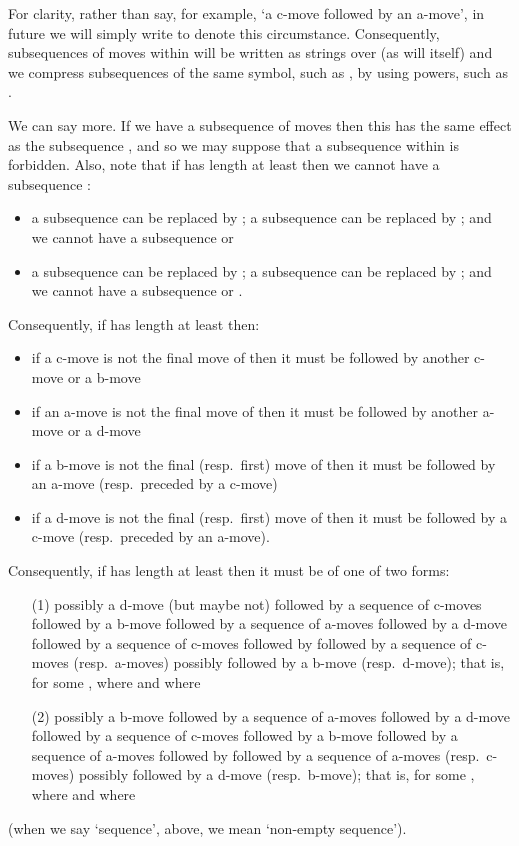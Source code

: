 \documentclass{article}
\begin{document}
For clarity, rather than say, for example, `a c-move followed by an a-move', in future we will simply write  to denote this circumstance. Consequently, subsequences of moves within  will be written as strings over  (as will  itself) and we compress subsequences of the same symbol, such as , by using powers, such as .

We can say more. If we have a subsequence of moves  then this has the same effect as the subsequence , and so we may suppose that a subsequence  within  is forbidden. Also, note that if  has length at least  then we cannot have a subsequence : 
\begin{itemize}
\item a subsequence  can be replaced by ; a subsequence  can be replaced by ; and we cannot have a subsequence  or 
\item a subsequence  can be replaced by ; a subsequence  can be replaced by ; and we cannot have a subsequence  or .
\end{itemize}
Consequently, if  has length at least  then:
\begin{itemize}
\item if a c-move is not the final move of  then it must be followed by another c-move or a b-move
\item if an a-move is not the final move of  then it must be followed by another a-move or a d-move
\item if a b-move is not the final (resp.\ first) move of  then it must be followed by an a-move (resp.\ preceded by a c-move)
\item if a d-move is not the final (resp.\ first) move of  then it must be followed by a c-move (resp.\ preceded by an a-move).
\end{itemize}
Consequently, if  has length at least  then it must be of one of two forms: \begin{itemize}
\item[(1)] possibly a d-move (but maybe not) followed by a sequence of c-moves followed by a b-move followed by a sequence of a-moves followed by a d-move followed by a sequence of c-moves followed by  followed by a sequence of c-moves (resp.\ a-moves) possibly followed by a b-move (resp.\ d-move); that is,  for some , where  and where 
\item[(2)] possibly a b-move followed by a sequence of a-moves followed by a d-move followed by a sequence of c-moves followed by a b-move followed by a sequence of a-moves followed by  followed by a sequence of a-moves (resp.\ c-moves) possibly followed by a d-move (resp.\ b-move); that is,  for some , where  and where 
\end{itemize}
(when we say `sequence', above, we mean `non-empty sequence').
\end{document}
